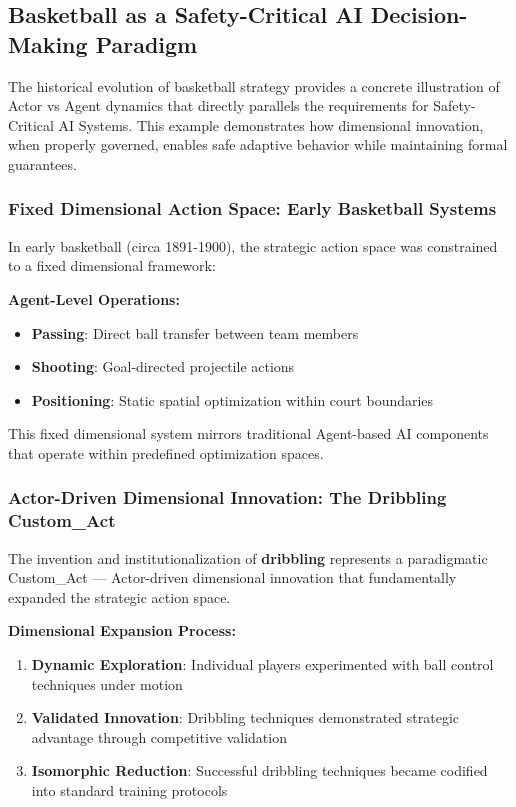 \documentclass[12pt,a4paper]{article}
\begin{document}
\subsection{Basketball as a Safety-Critical AI Decision-Making Paradigm}

The historical evolution of basketball strategy provides a concrete illustration of Actor vs Agent dynamics that directly parallels the requirements for Safety-Critical AI Systems. This example demonstrates how dimensional innovation, when properly governed, enables safe adaptive behavior while maintaining formal guarantees.

\subsubsection{Fixed Dimensional Action Space: Early Basketball Systems}

In early basketball (circa 1891-1900), the strategic action space was constrained to a fixed dimensional framework:

\textbf{Agent-Level Operations:}
\begin{itemize}
    \item \textbf{Passing}: Direct ball transfer between team members
    \item \textbf{Shooting}: Goal-directed projectile actions  
    \item \textbf{Positioning}: Static spatial optimization within court boundaries
\end{itemize}

This fixed dimensional system mirrors traditional Agent-based AI components that operate within predefined optimization spaces.

\subsubsection{Actor-Driven Dimensional Innovation: The Dribbling Custom\_Act}

The invention and institutionalization of \textbf{dribbling} represents a paradigmatic Custom\_Act — Actor-driven dimensional innovation that fundamentally expanded the strategic action space.

\textbf{Dimensional Expansion Process:}

\begin{enumerate}
    \item \textbf{Dynamic Exploration}: Individual players experimented with ball control techniques under motion
    \item \textbf{Validated Innovation}: Dribbling techniques demonstrated strategic advantage through competitive validation
    \item \textbf{Isomorphic Reduction}: Successful dribbling techniques became codified into standard training protocols
\end{enumerate}
\end{document}
